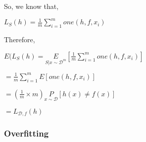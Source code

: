 \documentclass[a4paper]{article}
\begin{document}
\begin{itemize}
            So, we know that,
            \begin{center}
                $L_S(h) = \frac{1}{m}\displaystyle\sum_{i=1}^{m}one(h,f,x_i)$
            \end{center}
            Therefore,
            
            \begin{center}
                $E(L_S(h) = \underset{S|x\sim\mathcal{D}^m}{E}[\frac{1}{m}\displaystyle\sum_{i=1}^{m}one(h,f,x_i)]$
                
                \hspace{12px} $=\frac{1}{m}\displaystyle\sum_{i=1}^{m}E[one(h,f,x_i)]$
                
                \hspace{35px}$=(\frac{1}{m} \times m) \underset{x \sim \mathcal{D}}{P}[h(x) \neq f(x)]$
                
                \hspace{-45px} $=L_{\mathcal{D},f}(h)$
            \end{center}
        
        \subsubsection{Overfitting}
    
\end{itemize}
\end{document}
